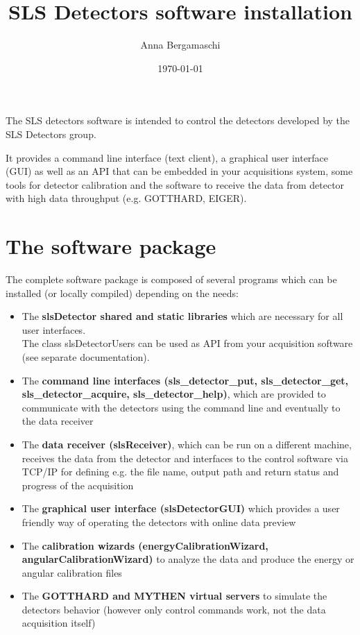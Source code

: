 \documentclass{article}
\begin{document}
\title{SLS Detectors software installation}
\author{Anna Bergamaschi}
\date{\today}
\maketitle
\tableofcontents
\clearpage




The SLS detectors software is intended to control the detectors developed by the SLS Detectors group.

It provides a command line interface (text client), a graphical user interface (GUI) as well as an API that can be embedded in your acquisitions system, some tools for detector calibration and the software to receive the data from detector with high data throughput (e.g. GOTTHARD, EIGER).



\section{The software package}


The complete software package is composed of several programs which can be installed (or locally compiled) depending on the needs:

\begin{itemize}
\item The \textbf{slsDetector shared and static libraries} which are necessary for all user interfaces. \\
  The class slsDetectorUsers can be used as API from your acquisition software (see separate documentation).
\item The \textbf{command line interfaces (sls\_detector\_put, sls\_detector\_get, sls\_detector\_acquire, sls\_detector\_help)}, which are provided to communicate with the detectors using the command line and eventually to the data receiver
\item The \textbf{data receiver (slsReceiver)}, which can be run on a different machine, receives the data from the detector and interfaces to the control software via TCP/IP for defining e.g. the file name, output path and return status and progress of the acquisition
\item The  \textbf{graphical user interface (slsDetectorGUI)} which provides a user friendly way of operating the detectors with online data preview
\item The  \textbf{calibration wizards (energyCalibrationWizard, angularCalibrationWizard)} to analyze the data and produce the energy or angular calibration files
\item The  \textbf{GOTTHARD and MYTHEN virtual servers} to simulate the detectors behavior (however only control commands work, not the data acquisition itself)
\end{itemize}
\end{document}
